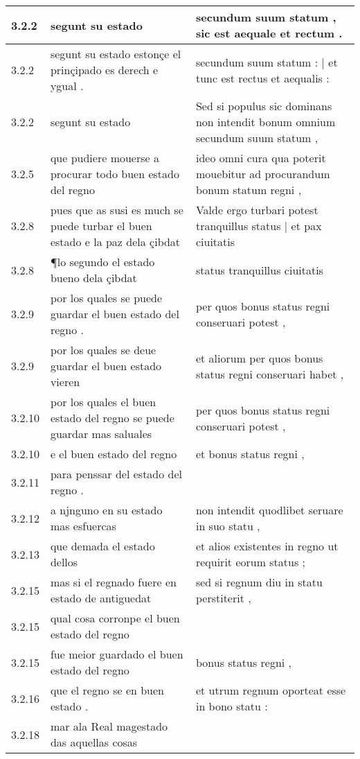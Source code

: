 \begin{tabular}{|p{1cm}|p{6.5cm}|p{6.5cm}|}
3.2.2 & segunt su estado & secundum suum statum , sic est aequale et rectum . \\\hline
3.2.2 & segunt su estado estonçe el prinçipado es derech e ygual . & secundum suum statum : | et tunc est rectus et aequalis : \\\hline
3.2.2 & segunt su estado & Sed si populus sic dominans non intendit bonum omnium secundum suum statum , \\\hline
3.2.5 & que pudiere mouerse a procurar todo buen estado del regno & ideo omni cura qua poterit mouebitur ad procurandum bonum statum regni , \\\hline
3.2.8 & pues que as susi es much se puede turbar el buen estado e la paz dela çibdat & Valde ergo turbari potest tranquillus status | et pax ciuitatis \\\hline
3.2.8 & ¶lo segundo el estado bueno dela çibdat & status tranquillus ciuitatis \\\hline
3.2.9 & por los quales se puede guardar el buen estado del regno . & per quos bonus status regni conseruari potest , \\\hline
3.2.9 & por los quales se deue guardar el buen estado vieren & et aliorum per quos bonus status regni conseruari habet , \\\hline
3.2.10 & por los quales el buen estado del regno se puede guardar mas saluales & per quos bonus status regni conseruari potest , \\\hline
3.2.10 & e el buen estado del regno & et bonus status regni , \\\hline
3.2.11 & para penssar del estado del regno . &  \\\hline
3.2.12 & a njnguno en su estado mas esfuercas & non intendit quodlibet seruare in suo statu , \\\hline
3.2.13 & que demada el estado dellos & et alios existentes in regno ut requirit eorum status ; \\\hline
3.2.15 & mas si el regnado fuere en estado de antiguedat & sed si regnum diu in statu perstiterit , \\\hline
3.2.15 & qual cosa corronpe el buen estado del regno &  \\\hline
3.2.15 & fue meior guardado el buen estado del regno & bonus status regni , \\\hline
3.2.16 & que el regno se en buen estado . & et utrum regnum oporteat esse in bono statu : \\\hline
3.2.18 & mar ala Real magestado das aquellas cosas &  \\\hline

\end{tabular}
